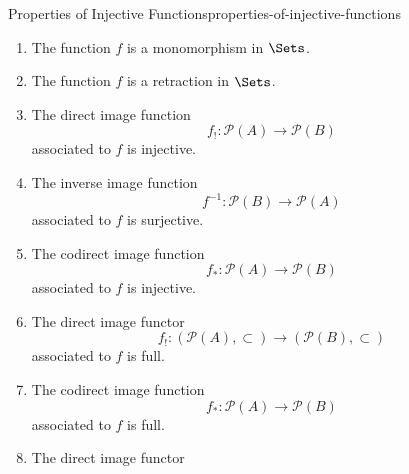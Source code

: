 \begin{proposition}{Properties of Injective Functions}{properties-of-injective-functions}
\begin{enumerate}
\begin{enumerate}
                \item\label{properties-of-injective-functions-characterisations-2}The function $f$ is a monomorphism in $\Sets$.
                \item\label{properties-of-injective-functions-characterisations-3}The function $f$ is a retraction in $\Sets$.
                \item\label{properties-of-injective-functions-characterisations-4}The direct image function
                    \[
                        f_{!}%
                        \colon%
                        \mathcal{P}(A)%
                        \to%
                        \mathcal{P}(B)%
                    \]%
                    associated to $f$ is injective.
                \item\label{properties-of-injective-functions-characterisations-5}The inverse image function
                    \[
                        f^{-1}%
                        \colon%
                        \mathcal{P}(B)%
                        \to%
                        \mathcal{P}(A)%
                    \]%
                    associated to $f$ is surjective.
                \item\label{properties-of-injective-functions-characterisations-6}The codirect image function
                    \[
                        f_{*}%
                        \colon%
                        \mathcal{P}(A)%
                        \to%
                        \mathcal{P}(B)%
                    \]%
                    associated to $f$ is injective.
                \item\label{properties-of-injective-functions-characterisations-7}The direct image functor
                    \[
                        f_{!}%
                        \colon%
                        (\mathcal{P}(A),\subset)%
                        \to%
                        (\mathcal{P}(B),\subset)%
                    \]%
                    associated to $f$ is full.
                \item\label{properties-of-injective-functions-characterisations-8}The codirect image function
                    \[
                        f_{*}%
                        \colon%
                        \mathcal{P}(A)%
                        \to%
                        \mathcal{P}(B)%
                    \]%
                    associated to $f$ is full.
                \item\label{properties-of-injective-functions-characterisations-9}The direct image functor
                    \[
\]
\end{enumerate}
\end{enumerate}
\end{proposition}
